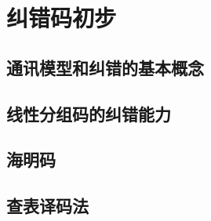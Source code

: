 \section{纠错码初步}

\subsection{通讯模型和纠错的基本概念}

\subsection{线性分组码的纠错能力}

\subsection{海明码}

\subsection{查表译码法}